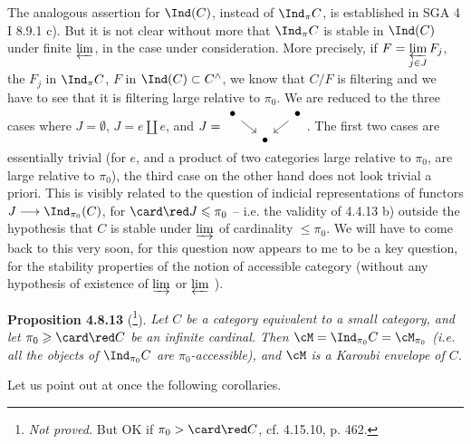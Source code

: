 The analogous assertion for $\Ind(C)$, instead of $\Ind_{\pi}C$, is established in SGA 4 I 8.9.1 c). But it is not clear without more that $\Ind_{\pi}C$ is stable in $\Ind(C)$ under finite $\varprojlim$, in the case under consideration. More precisely, if $F = \varprojlim\limits_{j\in J} F_j$, the $F_j$ in $\Ind_{\pi}C$,
$F$ in $\Ind(C) \subset C^{\wedge}$, we know that $C/F$ is filtering and we have to see that it is filtering large relative to $\pi_0$. We are reduced to the three cases where $J = \emptyset$, $J = e \amalg e$, and $J = \vcenter{\hbox{\begin{tikzcd}[ampersand replacement=\&, column sep=small, row sep=small]
\bullet \arrow[dr] \& \& \bullet \arrow[dl] \\
\& \bullet \&
\end{tikzcd}}}$. The first two cases are essentially trivial (for $e$, and a product of two categories large relative to $\pi_0$, are large relative to $\pi_0$), the third case on the other hand does not look trivial a priori. This is visibly related to the question of indicial representations of functors $J \longrightarrow \Ind_{\pi_0}(C)$, for $\card\red J \leqslant \pi_0$ -- i.e. the validity of 4.4.13 b) outside the hypothesis that $C$ is stable under $\varinjlim$ of cardinality $\leqslant \pi_0$. We will have to come back to this very soon, for this question now appears to me to be a key question, for the stability properties of the notion of accessible category (without any hypothesis of existence of $\varinjlim$ or $\varprojlim$ ). %

\textbf{Proposition 4.8.13} (\footnote[89]{\textit{Not proved.} But OK if $\pi_0 > \card\red C$, cf. 4.15.10, p. 462.}). \textit{Let $C$ be a category equivalent to a small category, and let $\pi_0 \geqslant \card\red C$ be an infinite cardinal. Then $\cM = \Ind_{\pi_0}C = \cM_{\pi_0}$ (i.e. all the objects of $\Ind_{\pi_0}C$ are $\pi_0$-accessible), and $\cM$ is a Karoubi envelope of $C$.}


Let us point out at once the following corollaries.


